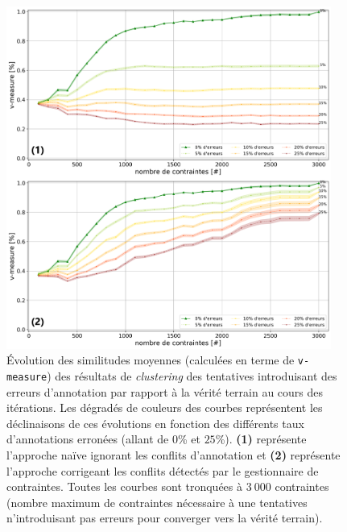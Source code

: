 			\begin{figure}[!htb]
				\centering
				\includegraphics[width=0.95\textwidth]{figures/etude-robustesse-erreurs-et-corrections-closest}
				\caption{
					Évolution des similitudes moyennes (calculées en terme de \texttt{v-measure}) des résultats de \textit{clustering} des tentatives introduisant des erreurs d'annotation par rapport à la vérité terrain au cours des itérations.
					Les dégradés de couleurs des courbes représentent les déclinaisons de ces évolutions en fonction des différents taux d'annotations erronées (allant de $0$\% et $25$\%).
					\textbf{(1)} représente l'approche naïve ignorant les conflits d'annotation
					et \textbf{(2)} représente l'approche corrigeant les conflits détectés par le gestionnaire de contraintes.
					Toutes les courbes sont tronquées à $3~000$ contraintes (nombre maximum de contraintes nécessaire à une tentatives n'introduisant pas erreurs pour converger vers la vérité terrain).
				}
				\label{figure:4.6.1-ETUDE-ROBUSTESSE-ERREURS-ANNOTATION-ET-CORRECTION}
			\end{figure}
			
